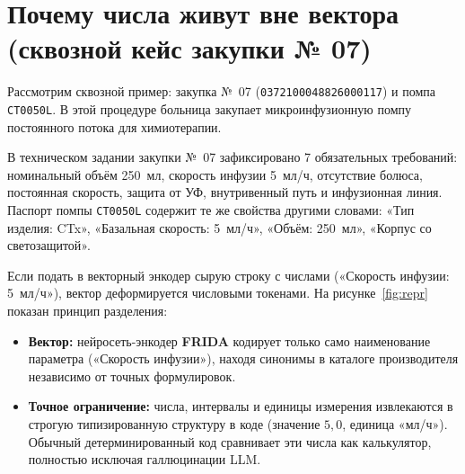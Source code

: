 \documentclass[10pt,a4paper]{article}
\begin{document}
\section{Почему числа живут вне вектора (сквозной кейс закупки № 07)}

Рассмотрим сквозной пример: закупка №~07 (\texttt{0372100048826000117}) и помпа \texttt{CT0050L}. В этой процедуре больница закупает микроинфузионную помпу постоянного потока для химиотерапии.

В техническом задании закупки №~07 зафиксировано 7 обязательных требований: номинальный объём 250~мл, скорость инфузии 5~мл/ч, отсутствие болюса, постоянная скорость, защита от УФ, внутривенный путь и инфузионная линия. Паспорт помпы \texttt{CT0050L} содержит те же свойства другими словами: «Тип изделия: CTx», «Базальная скорость: 5~мл/ч», «Объём: 250~мл», «Корпус со светозащитой».

Если подать в векторный энкодер сырую строку с числами («Скорость инфузии: 5~мл/ч»), вектор деформируется числовыми токенами. На рисунке~\ref{fig:repr} показан принцип разделения:
\begin{itemize}[leftmargin=1.1em, itemsep=0pt, topsep=1pt]
  \item \textbf{Вектор:} нейросеть-энкодер \textbf{FRIDA} кодирует только само наименование параметра («Скорость инфузии»), находя синонимы в каталоге производителя независимо от точных формулировок.
  \item \textbf{Точное ограничение:} числа, интервалы и единицы измерения извлекаются в строгую типизированную структуру в коде (значение $5{,}0$, единица «мл/ч»). Обычный детерминированный код сравнивает эти числа как калькулятор, полностью исключая галлюцинации LLM.
\end{itemize}
\end{document}
